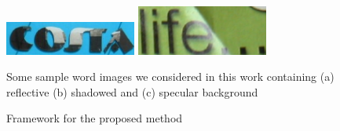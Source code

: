 \begin{figure}[t]
{\includegraphics[height=.6in,width=1.7in]{results/res_3/7.eps}
\includegraphics[height=.6in,width=1.7in]{results/res_3/10.eps}
\label{fig:subfig13}
}
\caption
{Some sample word images we considered in this work containing (a) reflective (b) shadowed and (c) specular background}
\label{fig:1}
\end{figure}
\begin{figure}[t]
\centering
{}
\caption
{Framework for the proposed method}
\label{fig:3}
\end{figure}


